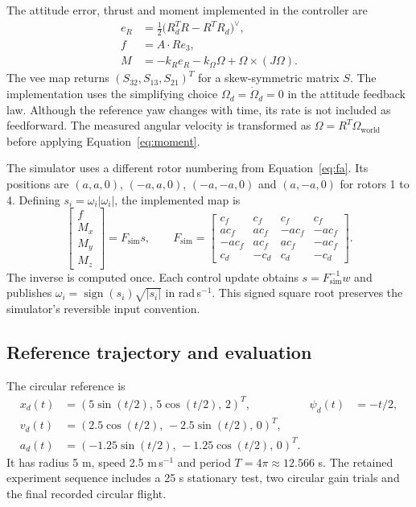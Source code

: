 \documentclass[12pt,a4paper,twoside]{article}
\begin{document}
The attitude error, thrust and moment implemented in the controller are
\begin{align}
 e_R&=\tfrac12\bigl(R_d^TR-R^TR_d\bigr)^\vee,\\
 f&=A\cdot Re_3,\\
 M&=-k_R e_R-k_\Omega\Omega+\Omega\times(J\Omega).
 \label{eq:moment}
\end{align}
The vee map returns $(S_{32},S_{13},S_{21})^T$ for a skew-symmetric matrix $S$. The implementation uses the simplifying choice $\Omega_d=\dot\Omega_d=0$ in the attitude feedback law. Although the reference yaw changes with time, its rate is not included as feedforward. The measured angular velocity is transformed as $\Omega=R^T\Omega_{\mathrm{world}}$ before applying Equation~\eqref{eq:moment}.

The simulator uses a different rotor numbering from Equation~\eqref{eq:fa}. Its positions are $(a,a,0)$, $(-a,a,0)$, $(-a,-a,0)$ and $(a,-a,0)$ for rotors 1 to 4. Defining $s_i=\omega_i|\omega_i|$, the implemented map is
\begin{equation}
 \begin{bmatrix}f\\M_x\\M_y\\M_z\end{bmatrix}
 =F_{\mathrm{sim}}s,\qquad
 F_{\mathrm{sim}}=\begin{bmatrix}
 c_f&c_f&c_f&c_f\\
 ac_f&ac_f&-ac_f&-ac_f\\
 -ac_f&ac_f&ac_f&-ac_f\\
 c_d&-c_d&c_d&-c_d
 \end{bmatrix}.
\end{equation}
The inverse is computed once. Each control update obtains $s=F_{\mathrm{sim}}^{-1}w$ and publishes $\omega_i=\operatorname{sign}(s_i)\sqrt{|s_i|}$ in rad\,s$^{-1}$. This signed square root preserves the simulator's reversible input convention.

\subsection{Reference trajectory and evaluation}
The circular reference is
\begin{align}
 x_d(t)&=(5\sin(t/2),\,5\cos(t/2),\,2)^T, & \psi_d(t)&=-t/2,\\
 v_d(t)&=(2.5\cos(t/2),\,-2.5\sin(t/2),\,0)^T,\\
 a_d(t)&=(-1.25\sin(t/2),\,-1.25\cos(t/2),\,0)^T.
\end{align}
It has radius 5 m, speed 2.5 m\,s$^{-1}$ and period $T=4\pi\approx12.566$ s. The retained experiment sequence includes a 25 s stationary test, two circular gain trials and the final recorded circular flight.
\end{document}
